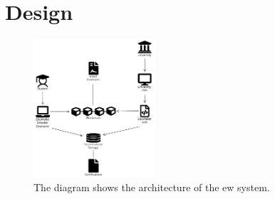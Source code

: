 \chapter{Design}
\begin{figure}[]  %
  \centering
  \includegraphics[width=0.4\textwidth]{figures/Architecture diagram.pdf}
  \caption[System architecture diagram]{The diagram shows the architecture of the \acrlong{ew} system.}
  \label{fig:archDiag}
\end{figure}